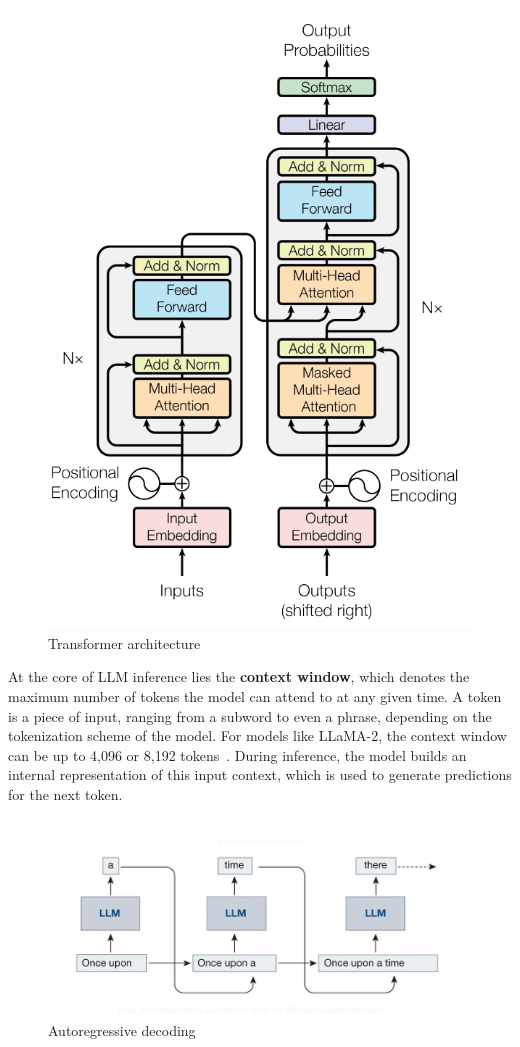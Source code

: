 \begin{figure}[h]
    \centering
    \includegraphics[width=0.4\linewidth]{images/transformer-architecture.png}
    \caption{Transformer architecture ~\cite{vaswani2017attention}}
    \label{fig:transformer_architecture}
\end{figure}
At the core of LLM inference lies the \textbf{context window}, which denotes the maximum number of tokens the model can attend to at any given time. A token is a piece of input, ranging from a subword to even a phrase, depending on the tokenization scheme of the model. For models like LLaMA-2, the context window can be up to 4,096 or 8,192 tokens~\cite{touvron2023llama}. During inference, the model builds an internal representation of this input context, which is used to generate predictions for the next token.

\begin{figure}[h]
    \centering
    \includegraphics[width=0.6\linewidth]{images/autoregressive-decoding.png}
    \caption{Autoregressive decoding ~\cite{nabi2024all}}
    \label{fig:autoregressive_decoding}
\end{figure}

